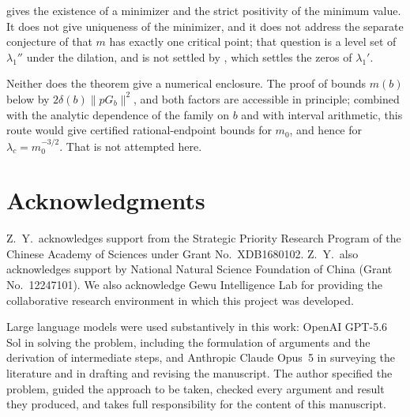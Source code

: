 \documentclass[11pt,reqno]{amsart}
\theoremstyle{plain}
\theoremstyle{definition}
\theoremstyle{remark}
\numberwithin{equation}{section}
\begin{document}
 gives the existence of a minimizer and the strict positivity
of the minimum value. It does not give uniqueness of the minimizer, and it
does not address the separate conjecture of \cite{baez1992renormalized} that
$m$ has exactly one critical point; that question is a level set of
$\lambda_1''$ under the dilation, and is not settled by
\cite{helffer2024critical}, which settles the zeros of $\lambda_1'$.

Neither does the theorem give a numerical enclosure. The proof of
 bounds $m(b)$ below by $2\delta(b)\|pG_b\|^2$, and both
factors are accessible in principle; combined with the analytic dependence of
the family on $b$ and with interval arithmetic, this route would give certified
rational-endpoint bounds for $m_0$, and hence for
$\lambda_c=m_0^{-3/2}$. That is not attempted here.

\section*{Acknowledgments}

Z.\ Y.\ acknowledges support from the Strategic Priority Research Program of the
Chinese Academy of Sciences under Grant No.~XDB1680102. Z.\ Y.\ also
acknowledges support by National Natural Science Foundation of China (Grant
No.~12247101). We also acknowledge Gewu Intelligence Lab for providing the
collaborative research environment in which this project was developed.

Large language models were used substantively in this work: OpenAI GPT-5.6 Sol
in solving the problem, including the formulation of arguments and the
derivation of intermediate steps, and Anthropic Claude Opus~5 in surveying the
literature and in drafting and revising the manuscript. The author specified
the problem, guided the approach to be taken, checked every argument and
result they produced, and takes full responsibility for the content of this
manuscript.



\end{document}
